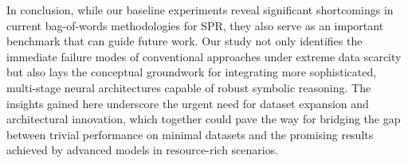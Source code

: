 \documentclass{article}
\begin{document}
In conclusion, while our baseline experiments reveal significant shortcomings in current bag-of-words methodologies for SPR, they also serve as an important benchmark that can guide future work. Our study not only identifies the immediate failure modes of conventional approaches under extreme data scarcity but also lays the conceptual groundwork for integrating more sophisticated, multi-stage neural architectures capable of robust symbolic reasoning. The insights gained here underscore the urgent need for dataset expansion and architectural innovation, which together could pave the way for bridging the gap between trivial performance on minimal datasets and the promising results achieved by advanced models in resource-rich scenarios.



\end{document}
